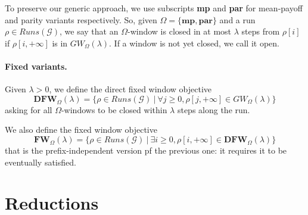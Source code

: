 \documentclass{article}
\newcommand{\CG}{\mathcal{G}}
\newcommand{\DFW}{\textbf{DFW}}
\newcommand{\FW}{\textbf{FW}}
\theoremstyle{plain}
\begin{document}
To preserve our generic approach, we use subscripts \textbf{mp} and \textbf{par} for mean-payoff and parity variants respectively. So, given $\Omega = \{ \textbf{mp}, \textbf{par}\}$ and a run $\rho \in Runs(\CG)$, we say that an $\Omega$-window is closed in at most $\lambda$ steps from $\rho [i]$ if $\rho [i, + \infty]$ is in $GW_{\Omega}(\lambda)$. If a window is not yet closed, we call it open.

\paragraph{Fixed variants.}
Given $\lambda > 0$, we define the direct fixed window objective
$$\DFW_{\Omega}(\lambda) = \{ \rho \in Runs(\CG) ~|~ \forall j \geqslant 0, \rho [j, + \infty] \in GW_{\Omega}(\lambda) \}$$
asking for all $\Omega$-windows to be closed within $\lambda$ steps along the run.

We also define the fixed window objective
$$\FW_{\Omega}(\lambda) = \{ \rho \in Runs(\CG) ~|~ \exists i \geqslant 0, \rho [i, + \infty] \in \DFW_{\Omega}(\lambda) \}$$
that is the prefix-independent version pf the previous one: it requires it to be eventually satisfied.


\section{Reductions}
\end{document}
